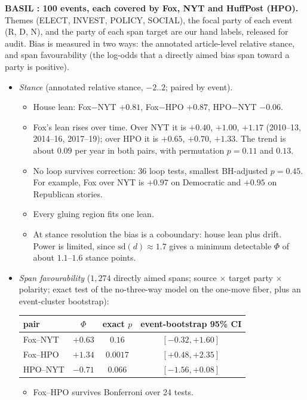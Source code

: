\documentclass[11pt]{article}
\theoremstyle{definition}
\theoremstyle{remark}
\begin{document}
\textbf{BASIL \cite{basil}: 100 events, each covered by Fox, NYT and HuffPost (HPO).} Themes (ELECT, INVEST, POLICY, SOCIAL), the focal party of each event (R, D, N), and the party of each span target are our hand labels, released for audit. Bias is measured in two ways: the annotated article-level relative stance, and span favourability (the log-odds that a directly aimed bias span toward a party is positive).
\begin{itemize}
  \item \emph{Stance} (annotated relative stance, $-2..2$; paired by event).
  \begin{itemize}
    \item House lean: Fox$-$NYT $+0.81$, Fox$-$HPO $+0.87$, HPO$-$NYT $-0.06$.
    \item Fox's lean rises over time. Over NYT it is $+0.40$, $+1.00$, $+1.17$ (2010--13, 2014--16, 2017--19); over HPO it is $+0.65$, $+0.70$, $+1.33$. The trend is about $0.09$ per year in both pairs, with permutation $p=0.11$ and $0.13$.
    \item No loop survives correction: 36 loop tests, smallest BH-adjusted $p=0.45$. For example, Fox over NYT is $+0.97$ on Democratic and $+0.95$ on Republican stories.
    \item Every gluing region fits one lean.
    \item At stance resolution the bias is a coboundary: house lean plus drift. Power is limited, since $\mathrm{sd}(d)\approx1.7$ gives a minimum detectable $\Phi$ of about $1.1$--$1.6$ stance points.
  \end{itemize}
  \item \emph{Span favourability} ($1{,}274$ directly aimed spans; source $\times$ target party $\times$ polarity; exact test of the no-three-way model on the one-move fiber, plus an event-cluster bootstrap):
  \begin{center}\small
  \begin{tabular}{lccc}
  \toprule
  pair & $\Phi$ & exact $p$ & event-bootstrap 95\% CI\\
  \midrule
  Fox--NYT & $+0.63$ & $0.16$ & $[-0.32,+1.60]$\\
  Fox--HPO & $+1.34$ & $0.0017$ & $[+0.48,+2.35]$\\
  HPO--NYT & $-0.71$ & $0.066$ & $[-1.56,+0.08]$\\
  \bottomrule
  \end{tabular}
  \end{center}
  \begin{itemize}
    \item Fox--HPO survives Bonferroni over 24 tests.

\end{itemize}
\end{itemize}
\end{document}
